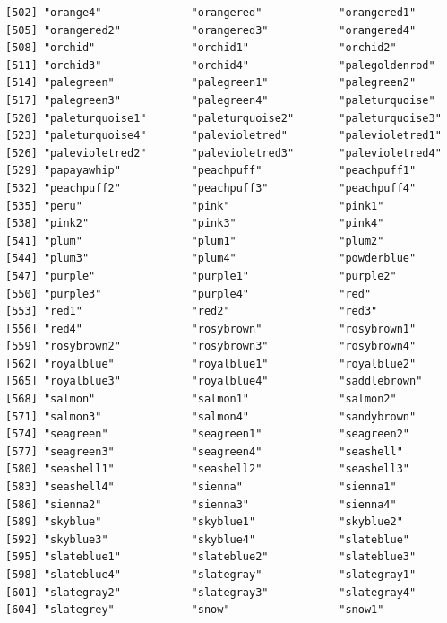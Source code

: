 \documentclass[a4paperpaper,]{article}
\theoremstyle{definition}
\theoremstyle{definition}
\theoremstyle{definition}
\theoremstyle{remark}
\begin{document}
\begin{verbatim}
[502] "orange4"              "orangered"            "orangered1"          
[505] "orangered2"           "orangered3"           "orangered4"          
[508] "orchid"               "orchid1"              "orchid2"             
[511] "orchid3"              "orchid4"              "palegoldenrod"       
[514] "palegreen"            "palegreen1"           "palegreen2"          
[517] "palegreen3"           "palegreen4"           "paleturquoise"       
[520] "paleturquoise1"       "paleturquoise2"       "paleturquoise3"      
[523] "paleturquoise4"       "palevioletred"        "palevioletred1"      
[526] "palevioletred2"       "palevioletred3"       "palevioletred4"      
[529] "papayawhip"           "peachpuff"            "peachpuff1"          
[532] "peachpuff2"           "peachpuff3"           "peachpuff4"          
[535] "peru"                 "pink"                 "pink1"               
[538] "pink2"                "pink3"                "pink4"               
[541] "plum"                 "plum1"                "plum2"               
[544] "plum3"                "plum4"                "powderblue"          
[547] "purple"               "purple1"              "purple2"             
[550] "purple3"              "purple4"              "red"                 
[553] "red1"                 "red2"                 "red3"                
[556] "red4"                 "rosybrown"            "rosybrown1"          
[559] "rosybrown2"           "rosybrown3"           "rosybrown4"          
[562] "royalblue"            "royalblue1"           "royalblue2"          
[565] "royalblue3"           "royalblue4"           "saddlebrown"         
[568] "salmon"               "salmon1"              "salmon2"             
[571] "salmon3"              "salmon4"              "sandybrown"          
[574] "seagreen"             "seagreen1"            "seagreen2"           
[577] "seagreen3"            "seagreen4"            "seashell"            
[580] "seashell1"            "seashell2"            "seashell3"           
[583] "seashell4"            "sienna"               "sienna1"             
[586] "sienna2"              "sienna3"              "sienna4"             
[589] "skyblue"              "skyblue1"             "skyblue2"            
[592] "skyblue3"             "skyblue4"             "slateblue"           
[595] "slateblue1"           "slateblue2"           "slateblue3"          
[598] "slateblue4"           "slategray"            "slategray1"          
[601] "slategray2"           "slategray3"           "slategray4"          
[604] "slategrey"            "snow"                 "snow1"               

\end{verbatim}
\end{document}
